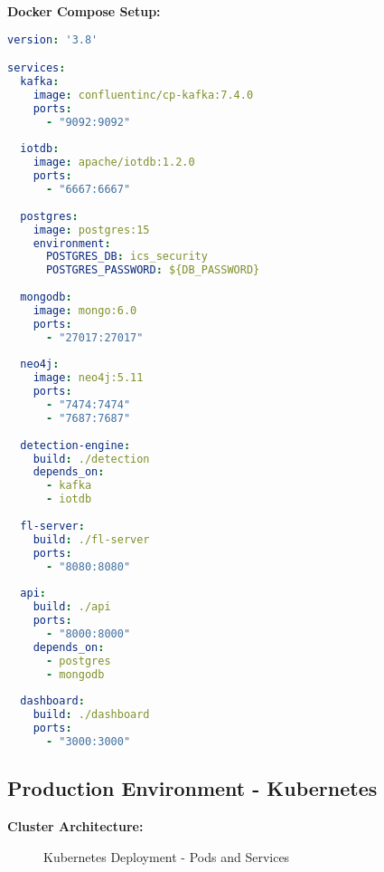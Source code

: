 \documentclass[12pt,a4paper]{article}
\begin{document}
\textbf{Docker Compose Setup:}
\begin{lstlisting}[language=yaml]
version: '3.8'

services:
  kafka:
    image: confluentinc/cp-kafka:7.4.0
    ports:
      - "9092:9092"
  
  iotdb:
    image: apache/iotdb:1.2.0
    ports:
      - "6667:6667"
  
  postgres:
    image: postgres:15
    environment:
      POSTGRES_DB: ics_security
      POSTGRES_PASSWORD: ${DB_PASSWORD}
  
  mongodb:
    image: mongo:6.0
    ports:
      - "27017:27017"
  
  neo4j:
    image: neo4j:5.11
    ports:
      - "7474:7474"
      - "7687:7687"
  
  detection-engine:
    build: ./detection
    depends_on:
      - kafka
      - iotdb
  
  fl-server:
    build: ./fl-server
    ports:
      - "8080:8080"
  
  api:
    build: ./api
    ports:
      - "8000:8000"
    depends_on:
      - postgres
      - mongodb
  
  dashboard:
    build: ./dashboard
    ports:
      - "3000:3000"
\end{lstlisting}

\subsection{Production Environment - Kubernetes}

\textbf{Cluster Architecture:}

\begin{figure}[H]
\centering
{}
\caption{Kubernetes Deployment - Pods and Services}
\end{figure}
\end{document}
